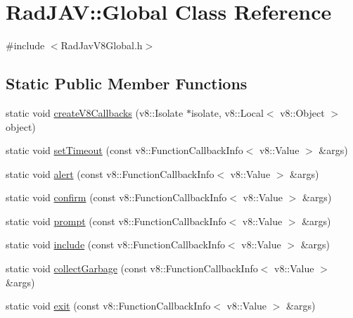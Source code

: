 \hypertarget{class_rad_j_a_v_1_1_global}{}\section{Rad\+J\+AV\+:\+:Global Class Reference}
\label{class_rad_j_a_v_1_1_global}


{\ttfamily \#include $<$Rad\+Jav\+V8\+Global.\+h$>$}

\subsection*{Static Public Member Functions}
\begin{DoxyCompactItemize}
\item 
static void \mbox{\hyperlink{class_rad_j_a_v_1_1_global_a5633a944f66dc6ca1ec8d92ab00e97b9}{create\+V8\+Callbacks}} (v8\+::\+Isolate $\ast$isolate, v8\+::\+Local$<$ v8\+::\+Object $>$ object)
\item 
static void \mbox{\hyperlink{class_rad_j_a_v_1_1_global_a04e02467b0d015ebefab82ecec99371a}{set\+Timeout}} (const v8\+::\+Function\+Callback\+Info$<$ v8\+::\+Value $>$ \&args)
\item 
static void \mbox{\hyperlink{class_rad_j_a_v_1_1_global_a62817cffccdbde43a591042002c56f72}{alert}} (const v8\+::\+Function\+Callback\+Info$<$ v8\+::\+Value $>$ \&args)
\item 
static void \mbox{\hyperlink{class_rad_j_a_v_1_1_global_ac7eb391b4cd7336c74f6c1b7967df044}{confirm}} (const v8\+::\+Function\+Callback\+Info$<$ v8\+::\+Value $>$ \&args)
\item 
static void \mbox{\hyperlink{class_rad_j_a_v_1_1_global_aeea7c6494e4f941cd6e7d29773ade6d0}{prompt}} (const v8\+::\+Function\+Callback\+Info$<$ v8\+::\+Value $>$ \&args)
\item 
static void \mbox{\hyperlink{class_rad_j_a_v_1_1_global_a0fb0b20f75e66da4ba021090ed8e74ea}{include}} (const v8\+::\+Function\+Callback\+Info$<$ v8\+::\+Value $>$ \&args)
\item 
static void \mbox{\hyperlink{class_rad_j_a_v_1_1_global_ac5b750ecedb422b20b9d89b46d06bebc}{collect\+Garbage}} (const v8\+::\+Function\+Callback\+Info$<$ v8\+::\+Value $>$ \&args)
\item 
static void \mbox{\hyperlink{class_rad_j_a_v_1_1_global_ac4bf5d57aa708dffac277280b07bc3f5}{exit}} (const v8\+::\+Function\+Callback\+Info$<$ v8\+::\+Value $>$ \&args)
\end{DoxyCompactItemize}


